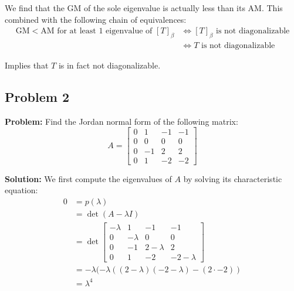\documentclass{article}
\begin{document}
We find that the GM of the sole eigenvalue is actually less than its AM. This combined with the following chain of equivalences:
\begin{align*}
  \text{GM}<\text{AM for at least 1 eigenvalue of }[T]_\beta&\iff[T]_\beta\text{ is not diagonalizable}\\
  &\iff T\text{ is not diagonalizable}
\end{align*}

Implies that $T$ is in fact not diagonalizable.
\newpage

\subsection*{Problem 2}
\noindent\textbf{Problem:} Find the Jordan normal form of the following matrix:
$$A=\begin{bmatrix}
  0&1&-1&-1\\0&0&0&0\\0&-1&2&2\\0&1&-2&-2
\end{bmatrix}$$
\smallskip

\noindent\textbf{Solution:} We first compute the eigenvalues of $A$ by solving its characteristic equation:
\begin{align*}
  0&=p(\lambda)\\
  &=\operatorname{det}(A-\lambda I)\\
  &=\operatorname{det}\begin{bmatrix}
    -\lambda&1&-1&-1\\0&-\lambda&0&0\\0&-1&2-\lambda&2\\0&1&-2&-2-\lambda
  \end{bmatrix}\\
  &=-\lambda(-\lambda((2-\lambda)(-2-\lambda)-(2\cdot-2))\\
  &=\lambda^4
\end{align*}
\end{document}
